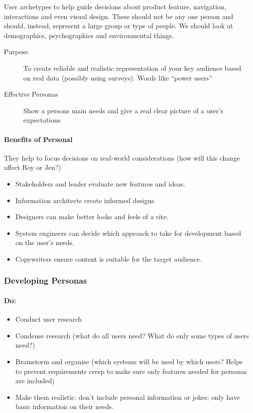 User archetypes to help guide decisions about product feature, navigation, interactions and even visual design.
These should not be any one person and should, instead, represent a large group or type of people.
We should look at demographics, psychographics and environmental things.

\begin{description}
    \item[Purpose] To create reliable and realistic representation of your key audience based on real data (possibly using surveys).
        Words like ``power users''
    \item[Effective Personas] Show a persons main needs and give a real clear picture of a user's expectations
\end{description}

\paragraph{Benefits of Personal}\label{par:benefits_of_personal}

They help to focus decisions on real-world considerations (how will this change affect Roy or Jen?)

\begin{itemize}
    \item Stakeholders and leader evaluate new features and ideas.
    \item Information architects create informed designs
    \item Designers can make better looks and feels of a site.
    \item System engineers can decide which approach to take for development based on the user's needs.
    \item Copywriters ensure content is suitable for the target audience.
\end{itemize}

\subsubsection{Developing Personas}\label{ssub:developing_personas}

\paragraph{Do:}\label{par:do_}

\begin{itemize}
    \item Conduct user research
    \item Condense research (what do all users need? What do only some types of users need?)
    \item Brainstorm and organise (which systems will be used by which users? Helps to prevent requirements creep to make sure only features needed for personas are included)
    \item Make them realistic: don't include personal information or jokes; only have basic information on their needs.
\end{itemize}

